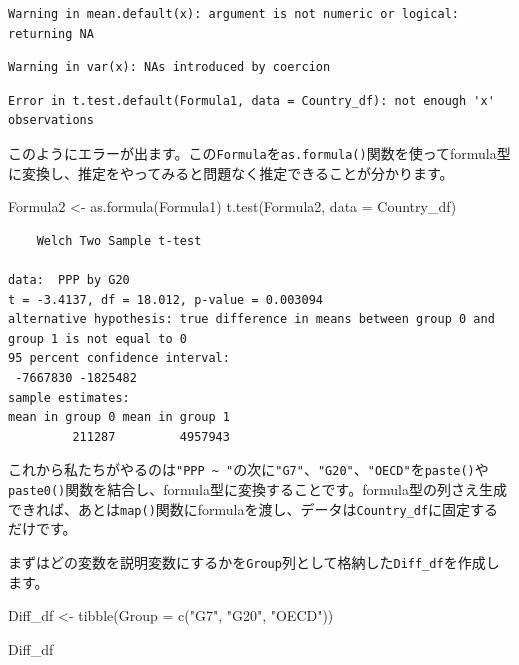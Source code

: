 \documentclass[
  a4paper,
  pandoc,
  ja=standard,
  jafont=haranoaji]{bxjsbook}
\newenvironment{Shaded}{\begin{snugshade}}{\end{snugshade}}
\newcommand{\AttributeTok}[1]{\textcolor[rgb]{0.00,0.48,0.65}{#1}}
\newcommand{\FunctionTok}[1]{\textcolor[rgb]{0.28,0.35,0.67}{#1}}
\newcommand{\NormalTok}[1]{\textcolor[rgb]{0.00,0.48,0.65}{#1}}
\newcommand{\OtherTok}[1]{\textcolor[rgb]{0.00,0.48,0.65}{#1}}
\newcommand{\StringTok}[1]{\textcolor[rgb]{0.13,0.47,0.30}{#1}}
\begin{document}
\begin{verbatim}
Warning in mean.default(x): argument is not numeric or logical: returning NA
\end{verbatim}

\begin{verbatim}
Warning in var(x): NAs introduced by coercion
\end{verbatim}

\begin{verbatim}
Error in t.test.default(Formula1, data = Country_df): not enough 'x' observations
\end{verbatim}

このようにエラーが出ます。この\texttt{Formula}を\texttt{as.formula()}関数を使ってformula型に変換し、推定をやってみると問題なく推定できることが分かります。

\begin{Shaded}
\begin{Highlighting}[numbers=left,,]
\NormalTok{Formula2 }\OtherTok{\textless{}{-}} \FunctionTok{as.formula}\NormalTok{(Formula1)}
\FunctionTok{t.test}\NormalTok{(Formula2, }\AttributeTok{data =}\NormalTok{ Country\_df)}
\end{Highlighting}
\end{Shaded}

\begin{verbatim}
    Welch Two Sample t-test

data:  PPP by G20
t = -3.4137, df = 18.012, p-value = 0.003094
alternative hypothesis: true difference in means between group 0 and group 1 is not equal to 0
95 percent confidence interval:
 -7667830 -1825482
sample estimates:
mean in group 0 mean in group 1 
         211287         4957943 
\end{verbatim}

これから私たちがやるのは\texttt{"PPP\ \textasciitilde{}\ "}の次に\texttt{"G7"}、\texttt{"G20"}、\texttt{"OECD"}を\texttt{paste()}や\texttt{paste0()}関数を結合し、formula型に変換することです。formula型の列さえ生成できれば、あとは\texttt{map()}関数にformulaを渡し、データは\texttt{Country\_df}に固定するだけです。

まずはどの変数を説明変数にするかを\texttt{Group}列として格納した\texttt{Diff\_df}を作成します。

\begin{Shaded}
\begin{Highlighting}[numbers=left,,]
\NormalTok{Diff\_df }\OtherTok{\textless{}{-}} \FunctionTok{tibble}\NormalTok{(}\AttributeTok{Group =} \FunctionTok{c}\NormalTok{(}\StringTok{"G7"}\NormalTok{, }\StringTok{"G20"}\NormalTok{, }\StringTok{"OECD"}\NormalTok{))}

\NormalTok{Diff\_df}
\end{Highlighting}
\end{Shaded}
\end{document}
